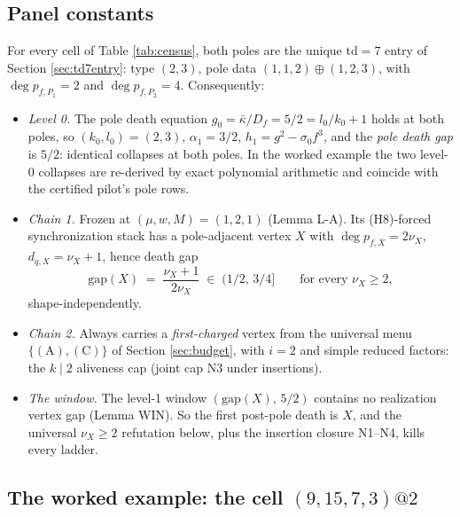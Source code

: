 \documentclass[11pt]{article}
\theoremstyle{definition}
\theoremstyle{remark}
\newcommand{\kb}{\bar\kappa}
\begin{document}
\subsection{Panel constants}\label{sec:panel}

For every cell of Table \ref{tab:census}, both poles are the unique $\mathrm{td}=7$ entry of Section \ref{sec:td7entry}: type $(2,3)$, pole data $(1,1,2)\oplus(1,2,3)$, with $\deg p_{f,P_1}=2$ and $\deg p_{f,P_2}=4$. Consequently:
\begin{itemize}
\item \emph{Level 0.} The pole death equation $g_0=\kb/D_f=5/2=l_0/k_0+1$ holds at both poles, so $(k_0,l_0)=(2,3)$, $\alpha_1=3/2$, $h_1=g^2-\sigma_0f^3$, and the \emph{pole death gap} is $5/2$: identical collapses at both poles. In the worked example the two level-0 collapses are re-derived by exact polynomial arithmetic and coincide with the certified pilot's pole rows.
\item \emph{Chain 1.} Frozen at $(\mu,w,M)=(1,2,1)$ (Lemma L-A). Its (H8)-forced synchronization stack has a pole-adjacent vertex $X$ with $\deg p_{f,X}=2\nu_X$, $d_{q,X}=\nu_X+1$, hence death gap
\[
\mathrm{gap}(X)\;=\;\frac{\nu_X+1}{2\nu_X}\;\in\;(1/2,\,3/4]\qquad\text{for every }\nu_X\geq2 ,
\]
shape-independently.
\item \emph{Chain 2.} Always carries a \emph{first-charged} vertex from the universal menu $\{(\mathrm A),(\mathrm C)\}$ of Section \ref{sec:budget}, with $i=2$ and simple reduced factors: the $k\mid2$ aliveness cap (joint cap N3 under insertions).
\item \emph{The window.} The level-1 window $(\mathrm{gap}(X),\,5/2)$ contains no realization vertex gap (Lemma WIN). So the first post-pole death is $X$, and the universal $\nu_X\geq2$ refutation below, plus the insertion closure N1--N4, kills every ladder.
\end{itemize}

\subsection{The worked example: the cell $(9,15,7,3)@2$}\label{sec:worked}
\end{document}
